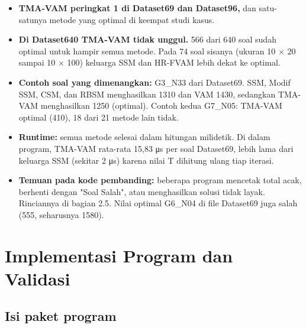 \documentclass[10pt,a4paper]{article}
\begin{document}
\begin{itemize}
\item
  \textbf{TMA-VAM peringkat 1 di Dataset69 dan Dataset96,} dan
  satu-satunya metode yang optimal di keempat studi kasus.
\item
  \textbf{Di Dataset640 TMA-VAM tidak unggul.} 566 dari 640 soal sudah
  optimal untuk hampir semua metode. Pada 74 soal sisanya (ukuran 10 ×
  20 sampai 10 × 100) keluarga SSM dan HR-FVAM lebih dekat ke optimal.
\item
  \textbf{Contoh soal yang dimenangkan:} G3\_N33 dari Dataset69. SSM,
  Modif SSM, CSM, dan RBSM menghasilkan 1310 dan VAM 1430, sedangkan
  TMA-VAM menghasilkan 1250 (optimal). Contoh kedua G7\_N05: TMA-VAM
  optimal (410), 18 dari 21 metode lain tidak.
\item
  \textbf{Runtime:} semua metode selesai dalam hitungan milidetik. Di
  dalam program, TMA-VAM rata-rata 15,83 μs per soal Dataset69, lebih
  lama dari keluarga SSM (sekitar 2 μs) karena nilai T dihitung ulang
  tiap iterasi.
\item
  \textbf{Temuan pada kode pembanding:} beberapa program mencetak total
  acak, berhenti dengan "Soal Salah", atau menghasilkan solusi tidak
  layak. Rinciannya di bagian 2.5. Nilai optimal G6\_N04 di file
  Dataset69 juga salah (555, seharusnya 1580).
\end{itemize}

\section{Implementasi Program dan Validasi}\label{program}

\subsection{Isi paket program}\label{isi-paket-program}
\end{document}
